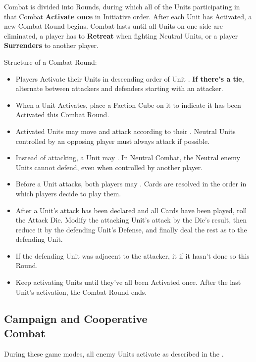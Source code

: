 \begin{multicols*}{2}

Combat is divided into Rounds, during which all of the Units participating in that Combat \textbf{Activate once} in Initiative order.
After each Unit has Activated, a new Combat Round begins.
Combat lasts until all Units on one side are eliminated, a player has to \textbf{Retreat} when fighting Neutral Units, or a player \textbf{Surrenders} to another player.

Structure of a Combat Round:
\begin{itemize}
  \item Players Activate their Units in descending order of Unit . \textbf{If there's a tie}, alternate between attackers and defenders starting with an attacker.
  \item When a Unit Activates, place a Faction Cube on it to indicate it has been Activated this Combat Round.
  \item Activated Units may move and attack according to their . Neutral Units controlled by an opposing player must always attack if possible.
  \item Instead of attacking, a Unit may .
  In Neutral Combat, the Neutral enemy Units cannot defend, even when controlled by another player.
  \item Before a Unit attacks, both players may . Cards are resolved in the order in which players decide to play them.
  \item After a Unit's attack has been declared and all Cards have been played, roll the Attack Die.
    Modify the attacking Unit's attack by the Die's result, then reduce it by the defending Unit's Defense, and finally deal the rest as  to the defending Unit.
  \item If the defending Unit was adjacent to the attacker, it  if it hasn't done so this Round.
  \item Keep activating Units until they've all been Activated once.
After the last Unit's activation, the Combat Round ends.
\end{itemize}
\vspace*{\fill}

\subsection*{Campaign and Cooperative\\Combat}
During these game modes, all enemy Units activate as described in the .
\vspace*{\fill}


\end{multicols*}
